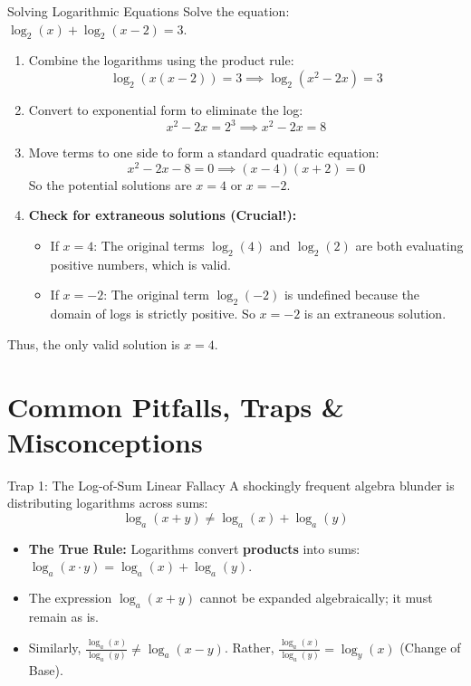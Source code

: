 \begin{examplebox}{Solving Logarithmic Equations}
Solve the equation: $\log_2(x) + \log_2(x-2) = 3$.
\begin{enumerate}
    \item Combine the logarithms using the product rule:
    $$\log_2(x(x-2)) = 3 \implies \log_2(x^2 - 2x) = 3$$
    \item Convert to exponential form to eliminate the log:
    $$x^2 - 2x = 2^3 \implies x^2 - 2x = 8$$
    \item Move terms to one side to form a standard quadratic equation:
    $$x^2 - 2x - 8 = 0 \implies (x-4)(x+2) = 0$$
    So the potential solutions are $x = 4$ or $x = -2$.
    \item {}\textbf{Check for extraneous solutions (Crucial!):}
    \begin{itemize}
        \item If $x = 4$: The original terms $\log_2(4)$ and $\log_2(2)$ are both evaluating positive numbers, which is valid.
        \item If $x = -2$: The original term $\log_2(-2)$ is undefined because the domain of logs is strictly positive. So $x=-2$ is an extraneous solution.
    \end{itemize}
\end{enumerate}
Thus, the only valid solution is $x = 4$.
\end{examplebox}

\section{Common Pitfalls, Traps \& Misconceptions}

\begin{trapbox}{Trap 1: The Log-of-Sum Linear Fallacy}
A shockingly frequent algebra blunder is distributing logarithms across sums:
$$\log_a(x + y) \neq \log_a(x) + \log_a(y)$$
\begin{itemize}
    \item \textbf{The True Rule:} Logarithms convert \textbf{products} into sums: $\log_a(x \cdot y) = \log_a(x) + \log_a(y)$.
    \item The expression $\log_a(x + y)$ cannot be expanded algebraically; it must remain as is.
    \item Similarly, $\frac{\log_a(x)}{\log_a(y)} \neq \log_a(x - y)$. Rather, $\frac{\log_a(x)}{\log_a(y)} = \log_y(x)$ (Change of Base).
\end{itemize}
\end{trapbox}

